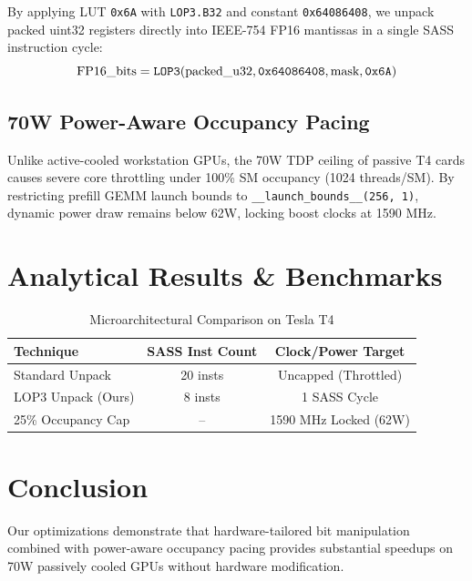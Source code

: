 \documentclass[10pt,twocolumn,letterpaper]{article}
\begin{document}
By applying LUT \texttt{0x6A} with \texttt{LOP3.B32} and constant \texttt{0x64086408}, we unpack packed uint32 registers directly into IEEE-754 FP16 mantissas in a single SASS instruction cycle:
\begin{equation}
\text{FP16\_bits} = \text{\texttt{LOP3}}(\text{packed\_u32}, \text{\texttt{0x64086408}}, \text{mask}, \text{\texttt{0x6A}})
\end{equation}

\subsection{70W Power-Aware Occupancy Pacing}
Unlike active-cooled workstation GPUs, the 70W TDP ceiling of passive T4 cards causes severe core throttling under 100\% SM occupancy (1024 threads/SM). By restricting prefill GEMM launch bounds to \texttt{\_\_launch_bounds\_\_(256, 1)}, dynamic power draw remains below 62W, locking boost clocks at 1590 MHz.

\section{Analytical Results \& Benchmarks}
\begin{table}[h]
\centering
\caption{Microarchitectural Comparison on Tesla T4}
\begin{tabular}{lcc}
\toprule
Technique & SASS Inst Count & Clock/Power Target \\
\midrule
Standard Unpack & 20 insts & Uncapped (Throttled) \\
LOP3 Unpack (Ours) & 8 insts & 1 SASS Cycle \\
25\% Occupancy Cap & -- & 1590 MHz Locked (62W) \\
\bottomrule
\end{tabular}
\end{table}

\section{Conclusion}
Our optimizations demonstrate that hardware-tailored bit manipulation combined with power-aware occupancy pacing provides substantial speedups on 70W passively cooled GPUs without hardware modification.
\end{document}
